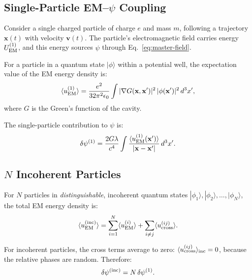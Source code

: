 \documentclass[aps,prd,twocolumn,superscriptaddress,floatfix,nofootinbib]{revtex4-2}
\newcommand{\lam}{\lambda}
\begin{document}
\subsection{Single-Particle EM--$\psi$ Coupling}
\label{sec:single-particle}

Consider a single charged particle of charge $e$ and mass $m$,
following a trajectory $\mathbf{x}(t)$ with velocity $\mathbf{v}(t)$.
The particle's electromagnetic field carries energy $U_{\rm EM}^{(1)}$,
and this energy sources $\psi$ through Eq.~\eqref{eq:master-field}.

For a particle in a quantum state $|\phi\rangle$ within a potential well,
the expectation value of the EM energy density is:
\begin{equation}
\langle u_{\rm EM}^{(1)}\rangle
= \frac{e^2}{32\pi^2\epsilon_0}
\int |\nabla G(\mathbf{x},\mathbf{x}')|^2\,
|\phi(\mathbf{x}')|^2\,d^3x',
\end{equation}
where $G$ is the Green's function of the cavity.

The single-particle contribution to $\psi$ is:
\begin{equation}
\delta\psi^{(1)} = \frac{2G\lam}{c^4}
\int\frac{\langle u_{\rm EM}^{(1)}(\mathbf{x}')\rangle}
{|\mathbf{x}-\mathbf{x}'|}\,d^3x'.
\end{equation}

\subsection{$N$ Incoherent Particles}
\label{sec:incoherent}

For $N$ particles in \emph{distinguishable}, incoherent quantum states
$|\phi_1\rangle, |\phi_2\rangle, \ldots, |\phi_N\rangle$, the total EM
energy density is:
\begin{equation}
\langle u_{\rm EM}^{(\rm inc)}\rangle
= \sum_{i=1}^{N}\langle u_{\rm EM}^{(i)}\rangle
+ \sum_{i \neq j}\langle u_{\rm cross}^{(ij)}\rangle.
\end{equation}

For incoherent particles, the cross terms average to zero:
$\langle u_{\rm cross}^{(ij)}\rangle_{\rm inc} = 0$, because
the relative phases are random. Therefore:
\begin{equation}
\delta\psi^{(\rm inc)} = N\,\delta\psi^{(1)}.
\label{eq:incoherent-scaling}
\end{equation}
\end{document}
